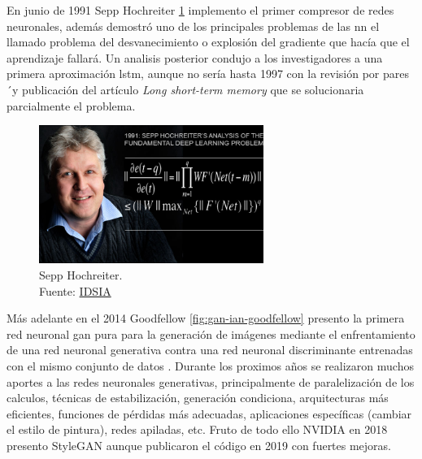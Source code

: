En junio de 1991 {Sepp Hochreiter} \ref{fig:sepp-hochreiter} implemento el primer compresor de redes neuronales, además demostró uno de los principales problemas de las \acrshort{nn} el llamado problema del desvanecimiento o explosión del gradiente que hacía que el aprendizaje fallará.
Un analisis posterior condujo a los investigadores a una primera aproximación \acrshort{lstm}, aunque no sería hasta 1997 con la revisión por pares´y publicación del artículo \textit{Long short-term memory} \cite{hochreiter1997long} que se solucionaria parcialmente el problema.

\begin{figure}[H]
  \centering
  \includegraphics[width=0.65\textwidth]{figures/Sepp Hochreiter.jpg}
  \caption{Sepp Hochreiter. \\Fuente: \href{https://people.idsia.ch/~juergen/fundamentaldeeplearningproblem.html}{IDSIA}}
  \label{fig:sepp-hochreiter}
\end{figure}



Más adelante en el 2014 {Goodfellow} \ref{fig:gan-ian-goodfellow} presento la primera red neuronal \acrshort{gan} pura para la generación de imágenes mediante el enfrentamiento de una red neuronal generativa contra una red neuronal discriminante entrenadas con el mismo conjunto de datos \cite{goodfellow2014generative}.
Durante los proximos años se realizaron muchos aportes a las redes neuronales generativas, principalmente de paralelización de los calculos, técnicas de estabilización, generación condiciona, arquitecturas más eficientes, funciones de pérdidas más adecuadas, aplicaciones específicas (cambiar el estilo de pintura), redes apiladas, etc.
Fruto de todo ello {NVIDIA} en 2018 presento \gls{StyleGAN} \cite{karras2019stylebased} aunque publicaron el código en 2019 con fuertes mejoras.

